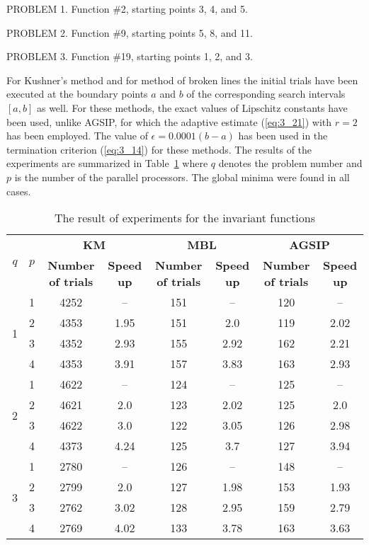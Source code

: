 	PROBLEM 1. Function \#2, starting points 3, 4, and 5. 
	
	PROBLEM 2. Function \#9, starting points 5, 8, and 11.
	
	PROBLEM 3. Function \#19, starting points 1, 2, and 3.
	
	For Kushner's method and for method of broken lines the initial trials have been executed at the boundary points $a$ and $b$ of the corresponding search intervals $[a,b]$ as well. For these methods, the exact values of Lipschitz constants have been used, unlike AGSIP, for which the adaptive estimate  (\ref{eq:3_21}) with $r=2$ has been employed. The value of $\epsilon = 0.0001(b-a)$ has been used in the termination criterion  (\ref{eq:3_14}) for these methods. The results of the experiments are summarized in Table~\ref{tab:3_1} where $q$ denotes the problem number and $p$ is the number of the parallel processors. The global minima were found in all cases.
	
	\begin{table}[ht]
		\centering
		\caption{The result of experiments for the invariant functions}
		\label{tab:3_1}
		{\setlength{\extrarowheight}{1.5pt}
			\begin{tabular}
				{|c|c|c|c|c|c|c|c|}
				\hline
				\multirow{2}{*}{\textbf{$q$}} 
				& \multirow{2}{*}{\textbf{$p$}} 
			    	 & \multicolumn{2}{|c|}{\textbf{KM}} 
				     & \multicolumn{2}{|c|}{\textbf{MBL}} & \multicolumn{2}{|c|}{\textbf{AGSIP}} \\
				\cline{3-8}
				  &  & \textbf{Number of trials} & \textbf{Speed up} 
				     & \textbf{Number of trials} & \textbf{Speed up} 
				     & \textbf{Number of trials} & \textbf{Speed up} \\ 
				\hline
				\multirow{4}{*}{1} 
				  & 1 & 4252 & --   & 151 & --   & 120 & --   \\ \cline{3-8}
				  & 2 & 4353 & 1.95 & 151 & 2.0  & 119 & 2.02 \\ \cline{3-8}
				  & 3 & 4352 & 2.93 & 155 & 2.92 & 162 & 2.21 \\ \cline{3-8}
				  & 4 & 4353 & 3.91 & 157 & 3.83 & 163 & 2.93 \\ \hline
				\multirow{4}{*}{2} 
				  & 1 & 4622 & --   & 124 & --   & 125 & --   \\ \cline{3-8}
				  & 2 & 4621 & 2.0  & 123 & 2.02 & 125 & 2.0  \\ \cline{3-8}
				  & 3 & 4622 & 3.0  & 122 & 3.05 & 126 & 2.98 \\ \cline{3-8}
				  & 4 & 4373 & 4.24 & 125 & 3.7  & 127 & 3.94 \\ \hline
				\multirow{4}{*}{3} 
				  & 1 & 2780 & --   & 126 & --   & 148 & --   \\ \cline{3-8}
				  & 2 & 2799 & 2.0  & 127 & 1.98 & 153 & 1.93 \\ \cline{3-8}
				  & 3 & 2762 & 3.02 & 128 & 2.95 & 159 & 2.79 \\ \cline{3-8}
				  & 4 & 2769 & 4.02 & 133 & 3.78 & 163 & 3.63 \\ \hline
				
			\end{tabular}
		}
	
	\end{table}


